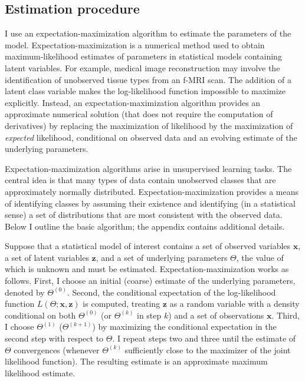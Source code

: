 \subsection{Estimation procedure}
\label{sec:em}
I use an expectation-maximization algorithm to estimate the parameters of the model. Expectation-maximization is a numerical method used to obtain maximum-likelihood estimates of parameters in statistical models containing latent variables. For example, medical image reconstruction may involve the identification of unobserved tissue types from an f-MRI scan.  The addition of a latent class variable makes the log-likelihood function impossible to maximize explicitly.  Instead, an expectation-maximization algorithm provides an approximate numerical solution (that does not require the computation of derivatives) by replacing the maximization of likelihood by the maximization of \textit{expected} likelihood, conditional on observed data and an evolving estimate of the underlying parameters.

Expectation-maximization algorithms arise in unsupervised learning tasks.  The central idea is that many types of data contain unobserved classes that are approximately normally distributed.  Expectation-maximization provides a means of identifying classes by assuming their existence and identifying (in a statistical sense) a set of distributions that are most consistent with the observed data.  Below I outline the basic algorithm; the appendix contains additional details.

Suppose that a statistical model of interest contains a set of observed variables $\mathbf{x}$, a set of latent variables $\mathbf{z}$, and a set of underlying parameters $\Theta$, the value of which is unknown and must be estimated.  Expectation-maximization works as follows.  First, I choose an initial (coarse) estimate of the underlying parameters, denoted by $\Theta^{(0)}$.  Second, the conditional expectation of the log-likelihood function $L(\Theta; \mathbf{x}, \mathbf{z})$ is computed, treating $\mathbf{z}$ as a random variable with a density conditional on both $\Theta^{(0)}$ (or $\Theta^{(k)}$ in step $k$) and a set of observations $\mathbf{x}$.  Third, I choose $\Theta^{(1)}$ ($\Theta^{(k+1)}$) by maximizing the conditional expectation in the second step with respect to $\Theta$.  I repeat steps two and three until the estimate of $\Theta$ convergences (whenever $\Theta^{(k)}$ sufficiently close to the maximizer of the joint likelihood function).  The resulting estimate is an approximate maximum likelihood estimate.

